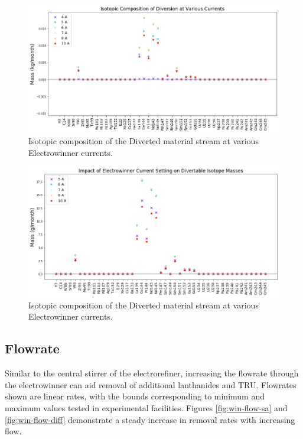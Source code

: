 \begin{figure}
	\includegraphics[width=\linewidth]{images/current-sa-comp}
	\caption{Isotopic composition of the Diverted material stream at various Electrowinner currents.}
	\label{fig:win-cur-sa}
\end{figure}

\begin{figure}
	\includegraphics[width=\linewidth]{images/current-sa-diff}
	\caption{Isotopic composition of the Diverted material stream at various Electrowinner currents.}
	\label{fig:win-cur-diff}
\end{figure}

\subsection{Flowrate}

Similar to the central stirrer of the electrorefiner, increasing the flowrate through the electrowinner can aid removal of additional lanthanides and TRU. Flowrates shown are linear rates, with the bounds corresponding to minimum and maximum values tested in experimental facilities. Figures \ref{fig:win-flow-sa} and \ref{fig:win-flow-diff} demonstrate a steady increase in removal rates with increasing flow.

